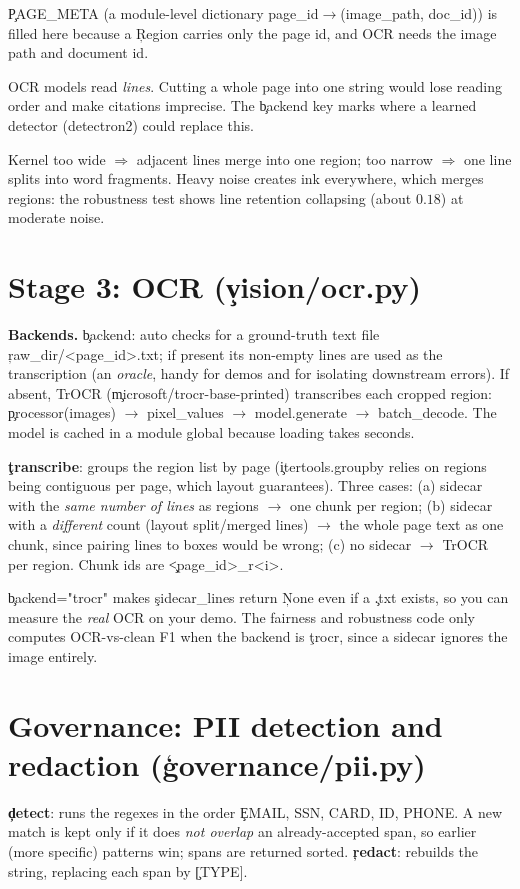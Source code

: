 \c{PAGE\_META} (a module-level dictionary page\_id$\to$(image\_path, doc\_id)) is filled here because a \c{Region} carries only the page id, and OCR needs the image path and document id.
\begin{why}
OCR models read \emph{lines}. Cutting a whole page into one string would lose reading order and make citations imprecise. The \c{backend} key marks where a learned detector (detectron2) could replace this.
\end{why}
\begin{gotcha}
Kernel too wide $\Rightarrow$ adjacent lines merge into one region; too narrow $\Rightarrow$ one line splits into word fragments. Heavy noise creates ink everywhere, which merges regions: the robustness test shows line retention collapsing (about $0.18$) at moderate noise.
\end{gotcha}

\section{Stage 3: OCR (\c{vision/ocr.py})}
\textbf{Backends.} \c{backend: auto} checks for a ground-truth text file \c{raw\_dir/<page\_id>.txt}; if present its non-empty lines are used as the transcription (an \emph{oracle}, handy for demos and for isolating downstream errors). If absent, TrOCR (\c{microsoft/trocr-base-printed}) transcribes each cropped region: \c{processor(images) $\to$ pixel\_values $\to$ model.generate $\to$ batch\_decode}. The model is cached in a module global because loading takes seconds.

\textbf{\c{transcribe}}: groups the region list by page (\c{itertools.groupby} relies on regions being contiguous per page, which layout guarantees). Three cases: (a) sidecar with the \emph{same number of lines} as regions $\to$ one chunk per region; (b) sidecar with a \emph{different} count (layout split/merged lines) $\to$ the whole page text as one chunk, since pairing lines to boxes would be wrong; (c) no sidecar $\to$ TrOCR per region. Chunk ids are \c{<page\_id>\_r<i>}.
\begin{gotcha}
\c{backend="trocr"} makes \c{sidecar\_lines} return \c{None} even if a \c{.txt} exists, so you can measure the \emph{real} OCR on your demo. The fairness and robustness code only computes OCR-vs-clean F1 when the backend is \c{trocr}, since a sidecar ignores the image entirely.
\end{gotcha}

\section{Governance: PII detection and redaction (\c{governance/pii.py})}
\textbf{\c{detect}}: runs the regexes in the order \c{EMAIL, SSN, CARD, ID, PHONE}. A new match is kept only if it does \emph{not overlap} an already-accepted span, so earlier (more specific) patterns win; spans are returned sorted. \textbf{\c{redact}}: rebuilds the string, replacing each span by \c{[TYPE]}.

